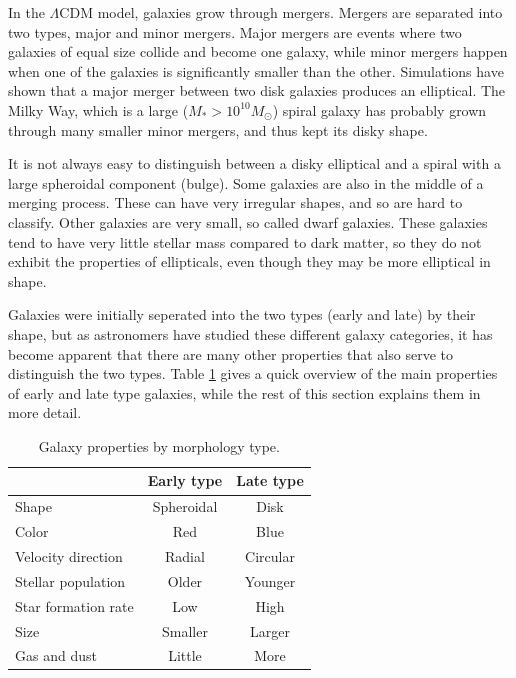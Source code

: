 In the $\Lambda$CDM model, galaxies grow through mergers. Mergers are separated into two types, major and minor mergers. Major mergers are events where two galaxies of equal size collide and become one galaxy, while minor mergers happen when one of the galaxies is significantly smaller than the other. Simulations have shown that a major merger between two disk galaxies produces an elliptical. The Milky Way, which is a large ($M_*>10^{10} M_\odot$) spiral galaxy has probably grown through many smaller minor mergers, and thus kept its disky shape.

It is not always easy to distinguish between a disky elliptical and a spiral with a large spheroidal component (bulge). Some galaxies are also in the middle of a merging process. These can have very irregular shapes, and so are hard to classify. Other galaxies are very small, so called dwarf galaxies. These galaxies tend to have very little stellar mass compared to dark matter, so they do not exhibit the properties of ellipticals, even though they may be more elliptical in shape.

Galaxies were initially seperated into the two types (early and late) by their shape, but as astronomers have studied these different galaxy categories, it has become apparent that there are many other properties that also serve to distinguish the two types. Table \ref{morphologies} gives a quick overview of the main properties of early and late type galaxies, while the rest of this section explains them in more detail.


\begin{table}
\begin{center}
\caption{Galaxy properties by morphology type.}
\label{morphologies}
\begin{tabular} { l| c c } 
 \hline
 \hline
  & Early type & Late type \\
 \hline
 Shape & Spheroidal & Disk \\
 Color & Red & Blue \\
 Velocity direction& Radial & Circular \\
 Stellar population & Older & Younger \\
 Star formation rate & Low & High \\
 Size & Smaller & Larger \\
 Gas and dust & Little & More \\
  
 \hline 
\end{tabular}
\end{center}
\end{table}

